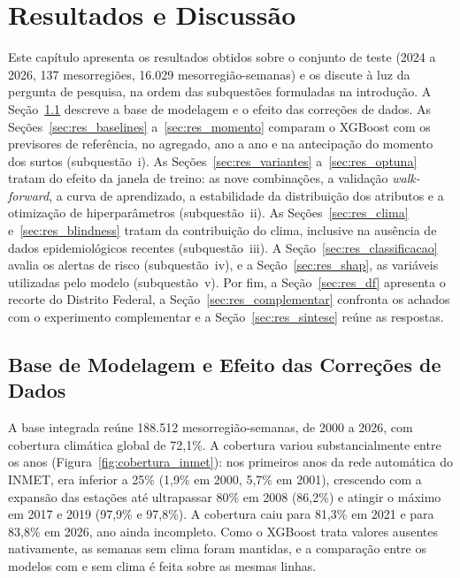 \chapter{Resultados e Discussão}
\label{cap:resultados}

Este capítulo apresenta os resultados obtidos sobre o conjunto de teste (2024 a 2026, 137 mesorregiões, 16.029 mesorregião-semanas) e os discute à luz da pergunta de pesquisa, na ordem das subquestões formuladas na introdução. A Seção~\ref{sec:res_dados} descreve a base de modelagem e o efeito das correções de dados. As Seções~\ref{sec:res_baselines} a~\ref{sec:res_momento} comparam o XGBoost com os previsores de referência, no agregado, ano a ano e na antecipação do momento dos surtos (subquestão~i). As Seções~\ref{sec:res_variantes} a~\ref{sec:res_optuna} tratam do efeito da janela de treino: as nove combinações, a validação \textit{walk-forward}, a curva de aprendizado, a estabilidade da distribuição dos atributos e a otimização de hiperparâmetros (subquestão~ii). As Seções~\ref{sec:res_clima} e~\ref{sec:res_blindness} tratam da contribuição do clima, inclusive na ausência de dados epidemiológicos recentes (subquestão~iii). A Seção~\ref{sec:res_classificacao} avalia os alertas de risco (subquestão~iv), e a Seção~\ref{sec:res_shap}, as variáveis utilizadas pelo modelo (subquestão~v). Por fim, a Seção~\ref{sec:res_df} apresenta o recorte do Distrito Federal, a Seção~\ref{sec:res_complementar} confronta os achados com o experimento complementar e a Seção~\ref{sec:res_sintese} reúne as respostas.

\section{Base de Modelagem e Efeito das Correções de Dados}
\label{sec:res_dados}

A base integrada reúne 188.512 mesorregião-semanas, de 2000 a 2026, com cobertura climática global de 72,1\%. A cobertura variou substancialmente entre os anos (Figura~\ref{fig:cobertura_inmet}): nos primeiros anos da rede automática do INMET, era inferior a 25\% (1,9\% em 2000, 5,7\% em 2001), crescendo com a expansão das estações até ultrapassar 80\% em 2008 (86,2\%) e atingir o máximo em 2017 e 2019 (97,9\% e 97,8\%). A cobertura caiu para 81,3\% em 2021 e para 83,8\% em 2026, ano ainda incompleto. Como o XGBoost trata valores ausentes nativamente, as semanas sem clima foram mantidas, e a comparação entre os modelos com e sem clima é feita sobre as mesmas linhas.

